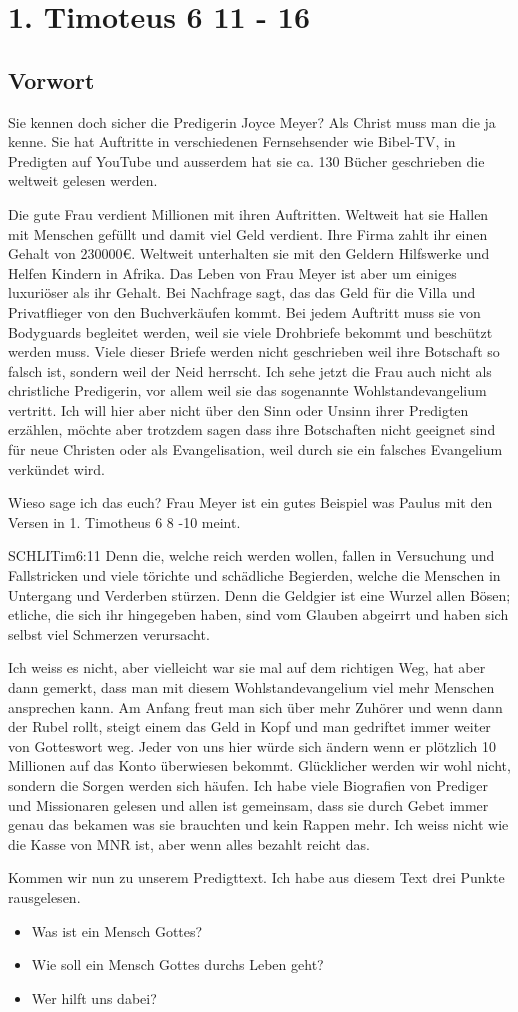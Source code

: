 \documentclass[12pt]{../../inc/mybib}
\author{Lothar Schmid}
\begin{document}
\section{1. Timoteus 6 11 - 16}

\subsection{Vorwort}
Sie kennen doch sicher die Predigerin Joyce Meyer? Als Christ muss man die ja kenne. Sie hat Auftritte in verschiedenen Fernsehsender wie Bibel-TV, in Predigten auf YouTube und ausserdem hat sie ca. 130 Bücher geschrieben die weltweit gelesen werden.

Die gute Frau verdient Millionen mit ihren Auftritten. Weltweit hat sie Hallen mit Menschen gefüllt und damit viel Geld verdient. Ihre Firma zahlt ihr einen Gehalt von 230000€. Weltweit unterhalten sie mit den Geldern Hilfswerke und Helfen Kindern in Afrika. Das Leben von Frau Meyer ist aber um einiges luxuriöser als ihr Gehalt. Bei Nachfrage sagt, das das Geld für die Villa und Privatflieger von den Buchverkäufen kommt. Bei jedem Auftritt muss sie von Bodyguards begleitet werden, weil sie viele Drohbriefe bekommt und beschützt werden muss. Viele dieser Briefe werden nicht geschrieben weil ihre Botschaft so falsch ist, sondern weil der Neid herrscht. Ich sehe jetzt die Frau auch nicht als christliche Predigerin, vor allem weil sie das sogenannte Wohlstandevangelium vertritt. Ich will hier aber nicht über den Sinn oder Unsinn ihrer Predigten erzählen, möchte aber trotzdem sagen dass ihre Botschaften nicht geeignet sind für neue Christen oder als Evangelisation, weil durch sie ein falsches Evangelium verkündet wird.

Wieso sage ich das euch? Frau Meyer ist ein gutes Beispiel was Paulus mit den Versen in 1. Timotheus 6 8 -10 meint.
\begin{bibelbox}{SCHL}{ITim}{6:11}
Denn die, welche reich werden wollen, fallen in Versuchung und Fallstricken und viele törichte und schädliche Begierden, welche die Menschen in Untergang und Verderben stürzen. Denn die Geldgier ist eine Wurzel allen Bösen; etliche, die sich ihr hingegeben haben, sind vom Glauben abgeirrt und haben sich selbst viel Schmerzen verursacht.
\end{bibelbox}
Ich weiss es nicht, aber vielleicht war sie mal auf dem richtigen Weg, hat aber dann gemerkt, dass man mit diesem Wohlstandevangelium viel mehr Menschen ansprechen kann. Am Anfang freut man sich über mehr Zuhörer und wenn dann der Rubel rollt, steigt einem das Geld in Kopf und man gedriftet immer weiter von Gotteswort weg. Jeder von uns hier würde sich ändern wenn er plötzlich 10 Millionen auf das Konto überwiesen bekommt. Glücklicher werden wir wohl nicht, sondern die Sorgen werden sich häufen. Ich habe viele Biografien von Prediger und Missionaren gelesen und allen ist gemeinsam, dass sie durch Gebet immer genau das bekamen was sie brauchten und kein Rappen mehr. Ich weiss nicht wie die Kasse von MNR ist, aber wenn alles bezahlt reicht das.

Kommen wir nun zu unserem Predigttext. Ich habe aus diesem Text drei Punkte rausgelesen.
\begin{itemize}
    \item Was ist ein Mensch Gottes?
    \item Wie soll ein Mensch Gottes durchs Leben geht?
    \item Wer hilft uns dabei?
\end{itemize}
\end{document}
